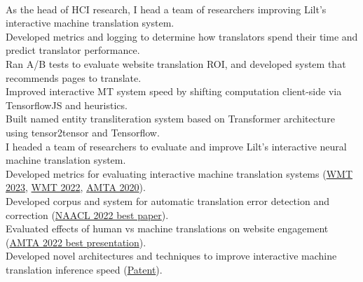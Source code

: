 \\
\ifdefined\hci
As the head of HCI research, I head a team of researchers improving Lilt's interactive machine translation system.\\
Developed metrics and logging to determine how translators spend their time and predict translator performance.\\
Ran A/B tests to evaluate website translation ROI, and developed system that recommends pages to translate. \\
Improved interactive MT system speed by shifting computation client-side via TensorflowJS and heuristics.\\
Built named entity transliteration system based on Transformer architecture using tensor2tensor and Tensorflow.\\  
\else
I headed a team of researchers to evaluate and improve Lilt's interactive neural machine translation system.\\
Developed metrics for evaluating interactive machine translation systems (\href{https://aclanthology.org/2023.wmt-1.53.pdf}{WMT 2023}, \href{https://aclanthology.org/2022.wmt-1.75.pdf}{WMT 2022}, \href{https://aclanthology.org/2020.amta-impact.7/}{AMTA 2020}).\\
Developed corpus and system for automatic translation error detection and correction (\href{https://aclanthology.org/2022.naacl-main.36.pdf}{NAACL 2022 best paper}).\\
Evaluated effects of human vs machine translations on website engagement (\href{https://aclanthology.org/2022.amta-research.23.pdf}{AMTA 2022 best presentation}).\\
Developed novel architectures and techniques to improve interactive machine translation inference speed (\href{https://patents.google.com/patent/US11900073B2}{Patent}).\\
\fi

